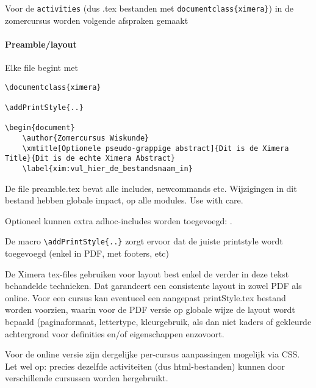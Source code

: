 \documentclass{ximera}
\begin{document}
Voor de \verb|activities| (dus .tex bestanden met \verb|documentclass{ximera}|) in de zomercursus worden volgende afspraken gemaakt

\paragraph{Preamble/layout}

Elke file begint met
\begin{verbatim}
\documentclass{ximera}

\addPrintStyle{..}

\begin{document}
    \author{Zomercursus Wiskunde}
    \xmtitle[Optionele pseudo-grappige abstract]{Dit is de Ximera Title}{Dit is de echte Ximera Abstract}
    \label{xim:vul_hier_de_bestandsnaam_in}
\end{verbatim}

De file preamble.tex bevat alle includes, newcommands etc. Wijzigingen in dit bestand hebben globale impact, op alle modules. Use with care.

Optioneel kunnen extra  adhoc-includes worden toegevoegd: \verb||.

De macro \verb|\addPrintStyle{..}| zorgt ervoor dat de juiste printstyle wordt toegevoegd (enkel in PDF, met footers, etc)

De Ximera tex-files gebruiken voor layout best enkel de verder in deze tekst behandelde technieken. 
Dat garandeert een consistente layout in zowel PDF als online. 
Voor een cursus kan eventueel een aangepast printStyle.tex bestand worden voorzien, waarin voor de PDF versie op globale wijze de layout wordt bepaald (paginaformaat, lettertype, kleurgebruik, als dan niet kaders of gekleurde achtergrond voor definities en/of eigenschappen enzovoort.

Voor de online versie zijn dergelijke per-cursus aanpassingen mogelijk via CSS. Let wel op: precies dezelfde activiteiten (dus html-bestanden) kunnen door verschillende cursussen worden hergebruikt.
\end{document}
